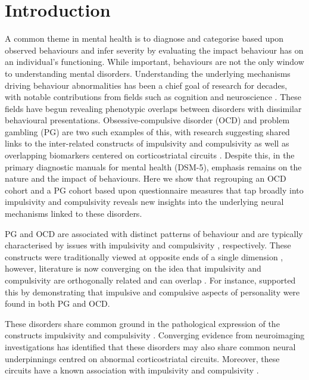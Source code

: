\section{Introduction}

A common theme in mental health is to diagnose and categorise based upon observed behaviours and infer severity by evaluating the impact behaviour has on an individual's functioning. While important, behaviours are not the only window to understanding mental disorders. Understanding the underlying mechanisms driving behaviour abnormalities has been a chief goal of research for decades, with notable contributions from fields such as cognition and neuroscience \cite{Frank_2015}. These fields have begun revealing phenotypic overlaps between disorders with dissimilar behavioural presentations. Obsessive-compulsive disorder (OCD) and problem gambling (PG) are two such examples of this, with research suggesting shared links to the inter-related constructs of impulsivity and compulsivity \cite{Tavares_2007} as well as overlapping biomarkers centered on corticostriatal circuits \cite{van_Holst_2010,Harrison_2009,Harrison_2013}. Despite this, in the primary diagnostic manuals for mental health (DSM-5), emphasis remains on the nature and the impact of behaviours. Here we show that regrouping an OCD cohort and a PG cohort based upon questionnaire measures that tap broadly into impulsivity and compulsivity reveals new insights into the underlying neural mechanisms linked to these disorders.


PG and OCD are associated with distinct patterns of behaviour and are typically characterised by issues with impulsivity \cite{Goudriaan_2004} and compulsivity \cite{Stein_1994}, respectively. These constructs were traditionally viewed at opposite ends of a single dimension \cite{Fineberg_2009}, however, literature is now converging on the idea that impulsivity and compulsivity are orthogonally related and can overlap \cite{Fineberg_2009,Fontenelle_2011}. For instance, \citet{Tavares_2007} supported this by demonstrating that impulsive and compulsive aspects of personality were found in both PG and OCD. 

These disorders share common ground in the pathological expression of the constructs impulsivity and compulsivity \cite{Tavares2007}. Converging evidence from neuroimaging investigations has identified that these disorders may also share common neural underpinnings centred on abnormal corticostriatal circuits. Moreover, these circuits have a known association with impulsivity and compulsivity \cite{Torregrossa2008}.






